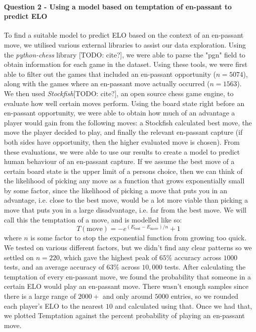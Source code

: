 \documentclass[10pt,a4paper,twocolumn]{article}
\begin{document}
\paragraph{Question 2 - Using a model based on temptation of en-passant to predict ELO}
To find a suitable model to predict ELO based on the context of an en-passant move, we utilised various external libraries to assist our data exploration. Using the \textit{python-chess} library [TODO: cite?], we were able to parse the "pgn" field to obtain information for each game in the dataset. Using these tools, we were first able to filter out the games that included an en-passant opportunity ($n=5074$), along with the games where an en-passant move actually occurred ($n=1563$). We then used \textit{Stockfish}[TODO: cite?], an open source chess game engine, to evaluate how well certain moves perform. Using the board state right before an en-passant opportunity, we were able to obtain how much of an advantage a player would gain from the following moves: a Stockfish calculated best move, the move the player decided to play, and finally the relevant en-passant capture (if both sides have opportunity, then the higher evaluated move is chosen).\newline
From these evaluations, we were able to use our results to create a model to predict human behaviour of an en-passant capture. If we assume the best move of a certain board state is the upper limit of a persons choice, then we can think of the likelihood of picking any move as a function that grows exponentially small by some factor, since the likelihood of picking a move that puts you in an advantage, i.e. close to the best move, would be a lot more viable than picking a move that puts you in a large disadvantage, i.e. far from the best move. We will call this the temptation of a move, and is modelled like so:
$$T(\text{move})= -e^{(E_{\text{best}} - E_{\text{move}})/{n}} + 1$$
where $n$ is some factor to stop the exponential function from growing too quick. We tested on various different factors, but we didn't find any clear patterns so we settled on $n=220$, which gave the highest peak of $65\%$ accuracy across $1000$ tests, and an average accuracy of $63\%$ across $10,000$ tests.\newline
After calculating the temptation of every en-passant move, we found the probability that someone in a certain ELO would play an en-passant move. There wasn't enough samples since there is a large range of $2000+$ and only around $5000$ entries, so we rounded each player's ELO to the nearest $10$ and calculated using that. Once we had that, we plotted Temptation against the percent probability of playing an en-passant move. 
\end{document}
